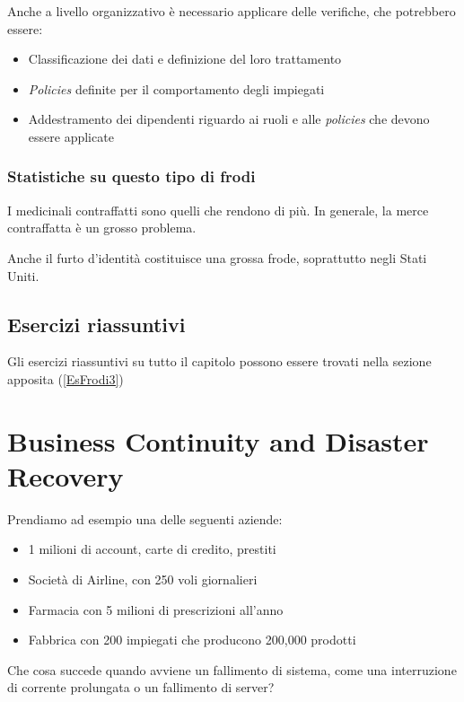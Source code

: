 Anche a livello organizzativo è necessario applicare delle verifiche, che
potrebbero essere:
\begin{itemize}
  \item Classificazione dei dati e definizione del loro trattamento
  \item \textit{Policies} definite per il comportamento degli impiegati
  \item Addestramento dei dipendenti riguardo ai ruoli e alle \textit{policies}
che devono essere applicate
\end{itemize}

\subsection{Statistiche su questo tipo di frodi}

I medicinali contraffatti sono quelli che rendono di più. In generale, la merce
contraffatta è un grosso problema.

Anche il furto d'identità costituisce una grossa frode, soprattutto negli
Stati Uniti.

\section{Esercizi riassuntivi}

Gli esercizi riassuntivi su tutto il capitolo possono essere trovati nella
sezione apposita (\ref{EsFrodi3})


\chapter{Business Continuity and Disaster Recovery}

Prendiamo ad esempio una delle seguenti aziende:
\begin{itemize}
  \item 1 milioni di account, carte di credito, prestiti
  \item Società di Airline, con 250 voli giornalieri
  \item Farmacia con 5 milioni di prescrizioni all'anno
  \item Fabbrica con 200 impiegati che producono 200,000 prodotti
\end{itemize}

Che cosa succede quando avviene un fallimento di sistema, come una interruzione
di corrente prolungata o un fallimento di server?

